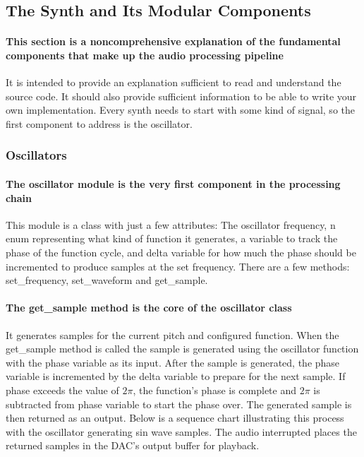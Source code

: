 \documentclass[acmlarge,screen]{acmart}
\begin{document}
\subsection{The Synth and Its Modular Components}
	\paragraph{This section is a noncomprehensive explanation of the fundamental components that make up the audio processing pipeline} It is intended to provide an explanation sufficient to read and understand the source code. It should also provide sufficient information to be able to write your own implementation. Every synth needs to start with some kind of signal, so the first component to address is the oscillator.
	
	\subsubsection{Oscillators}
	\paragraph{The oscillator module is the very first component in the processing chain} This module is a class with just a few attributes: The oscillator frequency, n enum representing what kind of function it generates, a variable to track the phase of the function cycle, and delta variable for how much the phase should be incremented to produce samples at the set frequency. There are a few methods: set\_frequency, set\_waveform and get\_sample. 
		
	\paragraph{The get\_sample method is the core of the oscillator class} It generates samples for the current pitch and configured function. When the get\_sample method is called the sample is generated using the oscillator function with the phase variable as its input. After the sample is generated, the phase variable is incremented by the delta variable to prepare for the next sample. If phase exceeds the value of \( 2\pi \), the function's phase is complete and \( 2\pi \) is subtracted from phase variable to start the phase over. The generated sample is then returned as an output. Below is a sequence chart illustrating this process with the oscillator generating sin wave samples. The audio interrupted places the returned samples in the DAC's output buffer for playback.\cite{farnell_2010}
	
\end{document}

